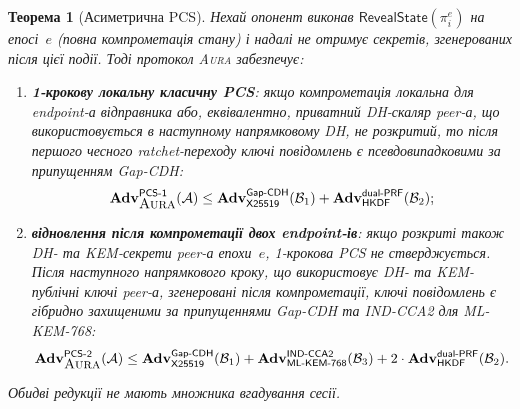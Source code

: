 \documentclass[11pt,a4paper]{article}
\newtheorem{theorem}{Теорема}[section]
\theoremstyle{definition}
\newcommand{\adv}{\ensuremath{\mathbf{Adv}}}
\newcommand{\advA}{\ensuremath{\mathcal{A}}}
\newcommand{\advB}{\ensuremath{\mathcal{B}}}
\newcommand{\HKDF}{\textsf{HKDF}}
\renewcommand{\DH}{\textsf{X25519}}
\newcommand{\KEM}{\textsf{ML-KEM-768}}
\newcommand{\GapCDH}{\textsf{Gap-CDH}}
\newcommand{\INDCCA}{\textsf{IND-CCA2}}
\newcommand{\dualPRF}{\textsf{dual-PRF}}
\newcommand{\Aura}{\mbox{\normalfont\scshape Aura}}
\begin{document}
\begin{theorem}[Асиметрична PCS]\label{thm:pcs}
Нехай опонент виконав $\mathsf{RevealState}(\pi_i^e)$ на епосі~$e$
(повна компрометація стану) і надалі не отримує секретів, згенерованих після
цієї події. Тоді протокол \Aura{} забезпечує:
\begin{enumerate}
  \item[\textbf{(а)}] \textbf{1-крокову локальну класичну PCS}: якщо
    компрометація локальна для endpoint-а відправника або, еквівалентно,
    приватний DH-скаляр peer-а, що використовується в наступному напрямковому
    DH, не розкритий, то після першого чесного ratchet-переходу ключі
    повідомлень є псевдовипадковими за припущенням \GapCDH{}:
    \begin{equation}\label{eq:pcs-classical-bound}
      \adv^{\mathsf{PCS\text{-}1}}_{\Aura}(\advA)
      \le
      \adv^{\GapCDH}_{\DH}(\advB_1)
      + \adv^{\dualPRF}_{\HKDF}(\advB_2);
    \end{equation}
  \item[\textbf{(б)}] \textbf{відновлення після компрометації двох
    endpoint-ів}: якщо розкриті також DH- та KEM-секрети peer-а епохи~$e$,
    1-крокова PCS не стверджується. Після наступного напрямкового кроку, що
    використовує DH- та KEM-публічні ключі peer-а, згенеровані після
    компрометації, ключі повідомлень є гібридно захищеними за припущеннями
    \GapCDH{} та \INDCCA{} для \KEM{}:
    \begin{equation}\label{eq:pcs-hybrid-bound}
      \adv^{\mathsf{PCS\text{-}2}}_{\Aura}(\advA)
      \le
      \adv^{\GapCDH}_{\DH}(\advB_1)
      + \adv^{\INDCCA}_{\KEM}(\advB_3)
      + 2 \cdot \adv^{\dualPRF}_{\HKDF}(\advB_2).
    \end{equation}
\end{enumerate}
Обидві редукції не мають множника вгадування сесії.
\end{theorem}
\end{document}
